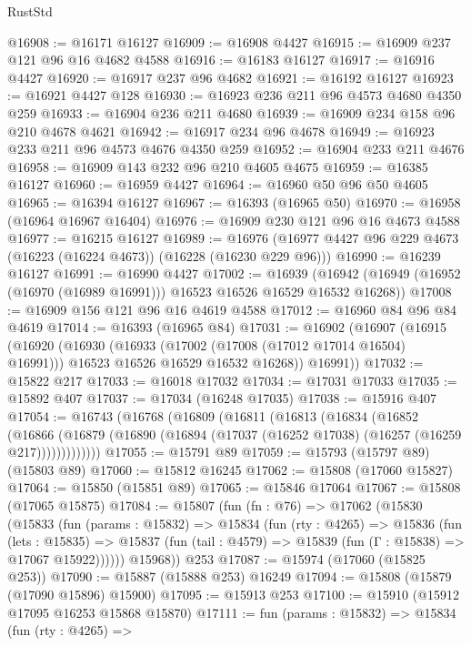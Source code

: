 \begin{lexlean}{RustStd}
\begin{coremodule}
@16908 := @16171 @16127
@16909 := @16908 @4427
@16915 := @16909 @237 @121 @96 @16 @4682 @4588
@16916 := @16183 @16127
@16917 := @16916 @4427
@16920 := @16917 @237 @96 @4682
@16921 := @16192 @16127
@16923 := @16921 @4427 @128
@16930 := @16923 @236 @211 @96 @4573 @4680 @4350 @259
@16933 := @16904 @236 @211 @4680
@16939 := @16909 @234 @158 @96 @210 @4678 @4621
@16942 := @16917 @234 @96 @4678
@16949 := @16923 @233 @211 @96 @4573 @4676 @4350 @259
@16952 := @16904 @233 @211 @4676
@16958 := @16909 @143 @232 @96 @210 @4605 @4675
@16959 := @16385 @16127
@16960 := @16959 @4427
@16964 := @16960 @50 @96 @50 @4605
@16965 := @16394 @16127
@16967 := @16393 (@16965 @50)
@16970 := @16958 (@16964 @16967 @16404)
@16976 := @16909 @230 @121 @96 @16 @4673 @4588
@16977 := @16215 @16127
@16989 := @16976 (@16977 @4427 @96 @229 @4673 (@16223 (@16224 @4673)) (@16228 (@16230 @229 @96)))
@16990 := @16239 @16127
@16991 := @16990 @4427
@17002 := @16939
    (@16942 (@16949 (@16952 (@16970 (@16989 @16991))) @16523 @16526 @16529 @16532 @16268))
@17008 := @16909 @156 @121 @96 @16 @4619 @4588
@17012 := @16960 @84 @96 @84 @4619
@17014 := @16393 (@16965 @84)
@17031 := @16902
    (@16907
      (@16915
        (@16920
          (@16930
            (@16933 (@17002 (@17008 (@17012 @17014 @16504) @16991)))
            @16523
            @16526
            @16529
            @16532
            @16268))
        @16991))
@17032 := @15822 @217
@17033 := @16018 @17032
@17034 := @17031 @17033
@17035 := @15892 @407
@17037 := @17034 (@16248 @17035)
@17038 := @15916 @407
@17054 := @16743
    (@16768
      (@16809
        (@16811
          (@16813
            (@16834
              (@16852
                (@16866
                  (@16879 (@16890 (@16894 (@17037 (@16252 @17038) (@16257 (@16259 @217)))))))))))))
@17055 := @15791 @89
@17059 := @15793 (@15797 @89) (@15803 @89)
@17060 := @15812 @16245
@17062 := @15808 (@17060 @15827)
@17064 := @15850 (@15851 @89)
@17065 := @15846 @17064
@17067 := @15808 (@17065 @15875)
@17084 := @15807
    (fun (fn : @76) =>
    @17062
      (@15830
        (@15833
          (fun (params : @15832) =>
          @15834
            (fun (rty : @4265) =>
            @15836
              (fun (lets : @15835) =>
              @15837 (fun (tail : @4579) => @15839 (fun (Γ : @15838) => @17067 @15922))))))
        @15968))
    @253
@17087 := @15974 (@17060 (@15825 @253))
@17090 := @15887 (@15888 @253) @16249
@17094 := @15808 (@15879 (@17090 @15896) @15900)
@17095 := @15913 @253
@17100 := @15910 (@15912 @17095 @16253 @15868 @15870)
@17111 := fun (params : @15832) =>
  @15834
    (fun (rty : @4265) =>

\end{coremodule}
\end{lexlean}
